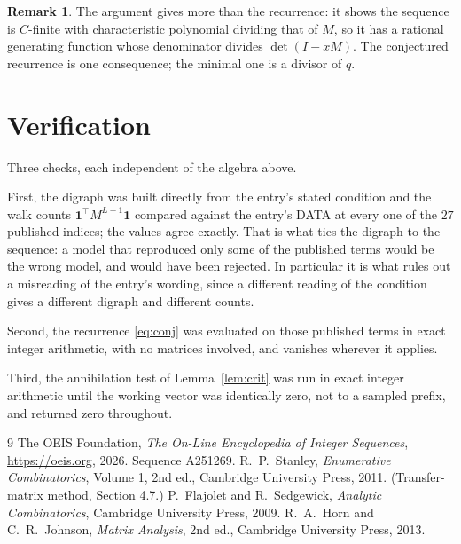 \documentclass[11pt,a4paper]{article}
\theoremstyle{plain}
\theoremstyle{definition}
\newtheorem{remark}[theorem]{Remark}
\begin{document}
\begin{remark}
The argument gives more than the recurrence: it shows the sequence is $C$-finite with
characteristic polynomial dividing that of $M$, so it has a rational generating function
whose denominator divides $\det(I-xM)$. The conjectured recurrence is one consequence; the
minimal one is a divisor of $q$.
\end{remark}

\section{Verification}

Three checks, each independent of the algebra above.

First, the digraph was built directly from the entry's stated condition and the walk counts
$\mathbf{1}^{\!\top}M^{L-1}\mathbf{1}$ compared against the entry's DATA at
every one of the $27$ published indices; the values agree exactly. That is what ties
the digraph to the sequence: a model that reproduced only some of the published terms would
be the wrong model, and would have been rejected. In particular it is what rules out a
misreading of the entry's wording, since a different reading of the condition gives a
different digraph and different counts.

Second, the recurrence \eqref{eq:conj} was evaluated on those published terms in exact
integer arithmetic, with no matrices involved, and vanishes wherever it applies.

Third, the annihilation test of Lemma~\ref{lem:crit} was run in exact integer arithmetic
until the working vector was identically zero, not to a sampled prefix, and returned zero
throughout.

\begin{thebibliography}{9}
 The OEIS Foundation, \emph{The On-Line Encyclopedia of Integer
Sequences}, \url{https://oeis.org}, 2026. Sequence A251269.
 R.~P.~Stanley, \emph{Enumerative Combinatorics}, Volume 1, 2nd ed.,
Cambridge University Press, 2011. (Transfer-matrix method, Section 4.7.)
 P.~Flajolet and R.~Sedgewick, \emph{Analytic Combinatorics}, Cambridge
University Press, 2009.
 R.~A.~Horn and C.~R.~Johnson, \emph{Matrix Analysis}, 2nd ed., Cambridge
University Press, 2013.
\end{thebibliography}
\end{document}
